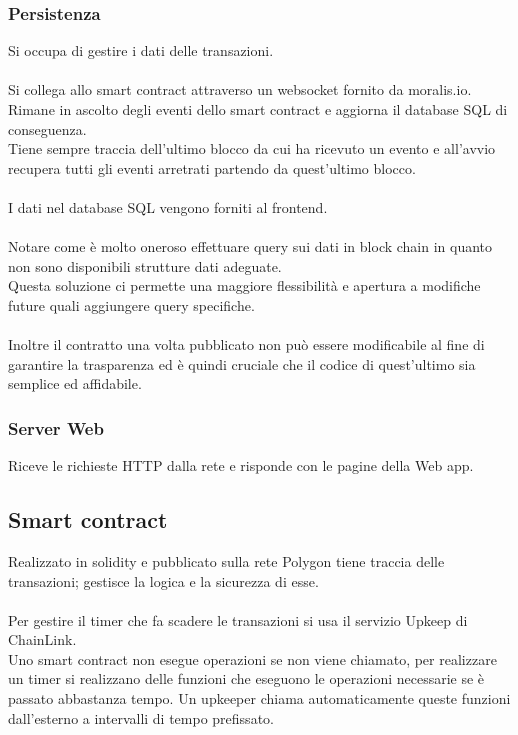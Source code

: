 \documentclass[a4paper, 12pt]{article}
\begin{document}
\subsubsection{Persistenza}
Si occupa di gestire i dati delle transazioni.\\\\
Si collega allo smart contract attraverso un websocket fornito da moralis.io.\\
Rimane in ascolto degli eventi dello smart contract e
aggiorna il database SQL di conseguenza.\\
Tiene sempre traccia dell'ultimo blocco da cui ha ricevuto un evento
e all'avvio recupera tutti gli eventi arretrati partendo da quest'ultimo blocco.\\\\
I dati nel database SQL vengono forniti al frontend.\\\\
Notare come è molto oneroso
effettuare query sui dati in block chain in quanto non sono disponibili strutture dati adeguate.\\
Questa soluzione ci permette una maggiore flessibilità e apertura a modifiche future quali aggiungere query specifiche.\\\\
Inoltre il contratto una volta pubblicato non può essere modificabile al fine di garantire la trasparenza ed è quindi cruciale
che il codice di quest'ultimo sia semplice ed affidabile.
\subsubsection{Server Web}
Riceve le richieste HTTP dalla rete e risponde con le pagine della Web app.

\subsection{Smart contract}
Realizzato in solidity e pubblicato sulla rete Polygon tiene traccia delle transazioni; gestisce la logica e la sicurezza di esse.\\\\
Per gestire il timer che fa scadere le transazioni si usa il servizio Upkeep di ChainLink.\\
Uno smart contract non esegue operazioni se non viene chiamato, per realizzare un timer si realizzano delle funzioni che
eseguono le operazioni necessarie se è passato abbastanza tempo. Un upkeeper chiama automaticamente queste funzioni dall'esterno a intervalli di tempo prefissato.
\end{document}
